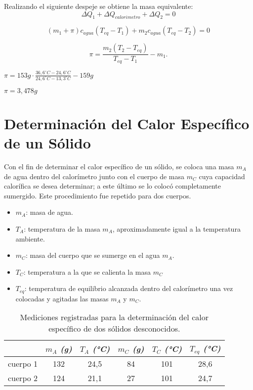 \documentclass[12pt, a4paper]{article}
\begin{document}
Realizando el siguiente despeje se obtiene la masa equivalente:
\begin{equation}
    \Delta Q_1 + \Delta Q_{calorimetro} + \Delta Q_2 = 0
\end{equation}

\begin{equation}
    (m_1 + \pi) c_{agua} (T_{eq} - T_1) + m_2 c_{agua} (T_{eq} - T_2) = 0
\end{equation}

\begin{equation}
    \pi = \frac{m_2 (T_2 - T_{eq})}{T_{eq} - T_1} - m_1.
\end{equation}

\begin{center}
    $ \pi = 153g \cdot \frac{36,6 ^\circ C - 24,6 ^\circ C }{24,6 ^\circ C - 13,3 ^\circ C } - 159g $
\end{center}

\begin{center}
    $ \pi = 3,478 g $
\end{center}



\section{Determinación del Calor Específico de un Sólido}
Con el fin de determinar el calor específico de un sólido, se coloca una masa $m_A$ de agua dentro del calorímetro junto con el cuerpo de masa $m_C$ cuya capacidad calorífica se desea determinar; a este último se lo colocó completamente sumergido. Este procedimiento fue repetido para dos cuerpos.

\begin{itemize}
    \item $m_A$: masa de agua.
    \item $T_A$: temperatura de la masa $m_A$, aproximadamente igual a la temperatura ambiente.
    \item $m_C$: masa del cuerpo que se sumerge en el agua $m_A$.
    \item $T_C$: temperatura a la que se calienta la masa $m_C$
    \item $T_{eq}$: temperatura de equilibrio alcanzada dentro del calorímetro una vez colocadas y agitadas las masas $m_A$ y $m_C$.
\end{itemize}

\begin{table}[h!]
\centering
\begin{tabular}{|c|c|c|c|c|c|}
\hline
 & \textit{$m_A$ (g)} & \textit{$T_A$ (°C)} & \textit{$m_C$ (g)} & \textit{$T_C$ (°C)} & \textit{$T_{eq}$ (°C)} \\
\hline
cuerpo 1 & 132 & 24,5 & 84 & 101 & 28,6 \\
\hline
cuerpo 2 & 124 & 21,1 & 27 & 101 & 24,7 \\
\hline
\end{tabular}
\caption{Mediciones registradas para la determinación del calor específico de dos sólidos desconocidos.}
\end{table}
\end{document}
